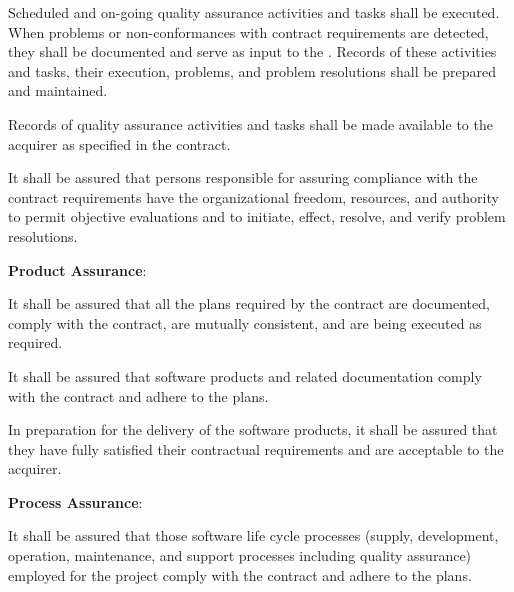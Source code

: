 \begin{adjustwidth}{2em}{0pt}
\begin{compactenum}
\begin{compactenum}
\begin{compactenum}
						\end{compactenum}

							\item Scheduled and on-going quality assurance activities and tasks shall be executed. When problems or non-conformances with contract requirements are detected, they shall be documented and serve as input to the . Records of these activities and tasks, their execution, problems, and problem resolutions shall be prepared and maintained.

							\item Records of quality assurance activities and tasks shall be made available to the acquirer as specified in the contract.

							\item It shall be assured that persons responsible for assuring compliance with the contract requirements have the organizational freedom, resources, and authority to permit objective evaluations and to initiate, effect, resolve, and verify problem resolutions.

					\end{compactenum}

					\item {\bf Product Assurance}:

					\begin{compactenum}

						\item It shall be assured that all the plans required by the contract are documented, comply with the contract, are mutually consistent, and are being executed as required.

						\item It shall be assured that software products and related documentation comply with the contract and adhere to the plans.

						\item In preparation for the delivery of the software products, it shall be assured that they have fully satisfied their contractual requirements and are acceptable to the acquirer.

					\end{compactenum}

					\item {\bf Process Assurance}:

					\begin{compactenum}

						\item It shall be assured that those software life cycle processes (supply, development, operation, maintenance, and support processes including quality assurance) employed for the project comply with the contract and adhere to the plans.


\end{compactenum}
\end{compactenum}
\end{adjustwidth}
